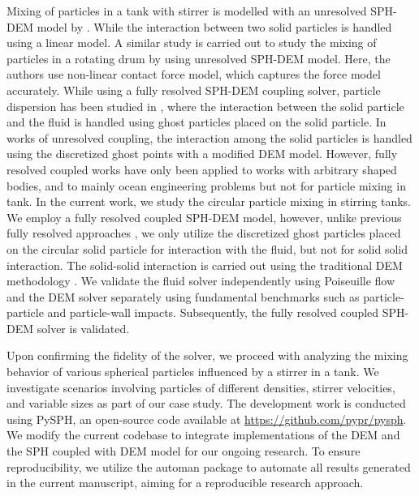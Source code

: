 \documentclass[preprint,12pt]{elsarticle}
\begin{document}
Mixing of particles in a tank with stirrer is modelled with an unresolved
SPH-DEM model by \citet{zhu2021virtual}. While the interaction between two
solid particles is handled using a linear model. A similar study is carried
out to study the mixing of particles in a rotating drum by \citet{he2018gpu}
using unresolved SPH-DEM model. Here, the authors use non-linear contact force
model, which captures the force model accurately.  While using a fully
resolved SPH-DEM coupling solver, particle dispersion has been studied in
\cite{ng2021numerical,canelas2016sph,canelas2017resolved,peng2021fully}, where
the interaction between the solid particle and the fluid is handled using
ghost particles placed on the solid particle. In works of unresolved coupling,
the interaction among the solid particles is handled using the discretized
ghost points with a modified DEM model. However, fully resolved coupled works
have only been applied to works with arbitrary shaped bodies, and to mainly
ocean engineering problems \cite{canelas2016sph,canelas2017resolved} but not
for particle mixing in tank.  In the current work, we study the circular
particle mixing in stirring tanks.  We employ a fully resolved coupled SPH-DEM
model, however, unlike previous fully resolved approaches
\cite{ng2021numerical,canelas2016sph,canelas2017resolved,peng2021fully}, we
only utilize the discretized ghost particles placed on the circular solid
particle for interaction with the fluid, but not for solid solid
interaction. The solid-solid interaction is carried out using the traditional
DEM methodology \cite{cundall_discrete_1979}. We validate the fluid solver
independently using Poiseuille flow and the DEM solver separately using
fundamental benchmarks such as particle-particle and particle-wall
impacts. Subsequently, the fully resolved coupled SPH-DEM solver is validated.

Upon confirming the fidelity of the solver, we proceed with analyzing the
mixing behavior of various spherical particles influenced by a stirrer in a
tank. We investigate scenarios involving particles of different densities,
stirrer velocities, and variable sizes as part of our case study. The
development work is conducted using PySPH\cite{ramachandran2021pysph}, an
open-source code available at \url{https://github.com/pypr/pysph}.  We modify
the current codebase to integrate implementations of the DEM and the SPH
coupled with DEM model for our ongoing research. To ensure reproducibility, we
utilize the automan package \cite{ramachandran2018automan} to automate all
results generated in the current manuscript, aiming for a reproducible
research approach.
\end{document}
